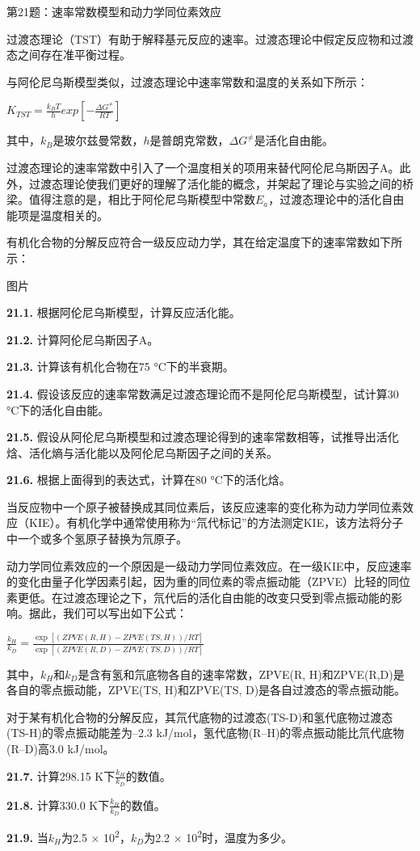 第21题：速率常数模型和动力学同位素效应

过渡态理论（TST）有助于解释基元反应的速率。过渡态理论中假定反应物和过渡态之间存在准平衡过程。

与阿伦尼乌斯模型类似，过渡态理论中速率常数和温度的关系如下所示：

\(K_{TST} = \frac{k_BT}{h} exp[- \frac{\Delta G^{\neq}}{RT}]\)

其中，\(k_B\)是玻尔兹曼常数，\(h\)是普朗克常数，\(\Delta G^{\neq}\)是活化自由能。

过渡态理论的速率常数中引入了一个温度相关的项用来替代阿伦尼乌斯因子A。此外，过渡态理论使我们更好的理解了活化能的概念，并架起了理论与实验之间的桥梁。值得注意的是，相比于阿伦尼乌斯模型中常数\(E_a\)，过渡态理论中的活化自由能项是温度相关的。

有机化合物的分解反应符合一级反应动力学，其在给定温度下的速率常数如下所示：

图片

\textbf{21.1.} 根据阿伦尼乌斯模型，计算反应活化能。

\textbf{21.2.} 计算阿伦尼乌斯因子A。

\textbf{21.3.} 计算该有机化合物在75 °C下的半衰期。

\textbf{21.4.}
假设该反应的速率常数满足过渡态理论而不是阿伦尼乌斯模型，试计算30
°C下的活化自由能。

\textbf{21.5.}
假设从阿伦尼乌斯模型和过渡态理论得到的速率常数相等，试推导出活化焓、活化熵与活化能以及阿伦尼乌斯因子之间的关系。

\textbf{21.6.} 根据上面得到的表达式，计算在80 °C下的活化焓。

当反应物中一个原子被替换成其同位素后，该反应速率的变化称为动力学同位素效应（KIE）。有机化学中通常使用称为``氘代标记''的方法测定KIE，该方法将分子中一个或多个氢原子替换为氘原子。

动力学同位素效应的一个原因是一级动力学同位素效应。在一级KIE中，反应速率的变化由量子化学因素引起，因为重的同位素的零点振动能（ZPVE）比轻的同位素更低。在过渡态理论之下，氘代后的活化自由能的改变只受到零点振动能的影响。据此，我们可以写出如下公式：

\(\frac{k_H}{k_D} = \frac{\exp[(ZPVE(R, H)-ZPVE(TS,H))/RT]}{\exp[(ZPVE(R, D)-ZPVE(TS, D))/RT]}\)

其中，\(k_H\)和\(k_D\)是含有氢和氘底物各自的速率常数，ZPVE(R,
H)和ZPVE(R,D)是各自的零点振动能，ZPVE(TS, H)和ZPVE(TS,
D)是各自过渡态的零点振动能。

对于某有机化合物的分解反应，其氘代底物的过渡态(TS-D)和氢代底物过渡态(TS-H)的零点振动能差为--2.3
kJ/mol，氢代底物(R--H)的零点振动能比氘代底物(R--D)高3.0 kJ/mol。

\textbf{21.7.} 计算298.15 K下\(\frac{k_H}{k_D}\)的数值。

\textbf{21.8.} 计算330.0 K下\(\frac{k_H}{k_D}\)的数值。

\textbf{21.9.} 当\(k_H\)为2.5 × 10\textsuperscript{2}，\(k_D\)为2.2 ×
10\textsuperscript{2}时，温度为多少。
